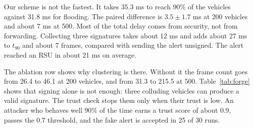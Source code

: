 \documentclass[11pt, a4paper]{article}
\begin{document}
Our scheme is not the fastest. It takes 35.3 ms to reach 90\% of the vehicles against 31.8 ms for flooding. The paired difference is $3.5 \pm 1.7$ ms at 200 vehicles and about 7 ms at 500. Most of the total delay comes from security, not from forwarding. Collecting three signatures takes about 12 ms and adds about 27 ms to $t_{90}$ and about 7 frames, compared with sending the alert unsigned. The alert reached an RSU in about 21 ms on average.

The ablation row shows why clustering is there. Without it the frame count goes from 26.4 to 46.1 at 200 vehicles, and from 31.3 to 215.5 at 500. Table~\ref{tab:forge} shows that signing alone is not enough: three colluding vehicles can produce a valid signature. The trust check stops them only when their trust is low. An attacker who behaves well 90\% of the time earns a trust score of about 0.9, passes the 0.7 threshold, and the fake alert is accepted in 25 of 30 runs.

\end{document}
